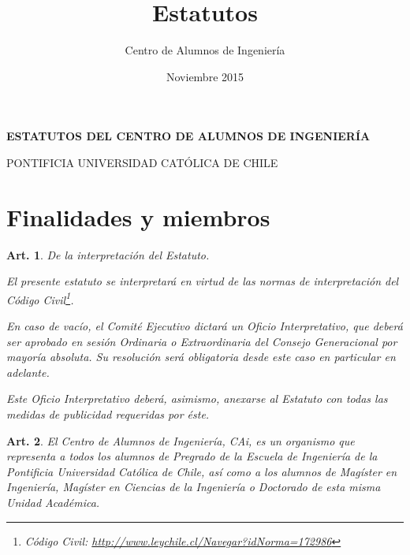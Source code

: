 \documentclass[letterpaper,11pt]{article}
\title{Estatutos}
\author{Centro de Alumnos de Ingeniería}
\date{Noviembre 2015}
\theoremstyle{plain}
\newtheorem{art}{Art.} %
\begin{document}
	\thispagestyle{plain}
	\vspace*{-75pt}

	\begin{center}
		\begin{Large}
			{\bf
			ESTATUTOS DEL CENTRO DE ALUMNOS DE INGENIERÍA

			PONTIFICIA UNIVERSIDAD CATÓLICA DE CHILE
			}
		\end{Large}

		\vspace*{30pt}

	\end{center}

	\section{Finalidades y miembros}\label{finalidades}

		\begin{art}\label{interpretacionEstatuto}
			De la interpretación del Estatuto.

			El presente estatuto se interpretará en virtud de las normas de interpretación del Código Civil\footnote{Código Civil: \url{http://www.leychile.cl/Navegar?idNorma=172986}}.

			En caso de vacío, el Comité Ejecutivo dictará un Oficio Interpretativo, que deberá ser aprobado en sesión Ordinaria o Extraordinaria del Consejo Generacional por mayoría absoluta. Su resolución será obligatoria desde este caso en particular en adelante.

			Este Oficio Interpretativo deberá, asimismo, anexarse al Estatuto con todas las medidas de publicidad requeridas por éste.
		\end{art}

		\begin{art}\label{representacionCAi}
			El Centro de Alumnos de Ingeniería, CAi, es un organismo que representa a todos los alumnos de Pregrado de la Escuela de Ingeniería de la Pontificia Universidad Católica de Chile, así como a los alumnos de Magíster en Ingeniería, Magíster en Ciencias de la Ingeniería o Doctorado de esta misma Unidad Académica.
		\end{art}
\end{document}
